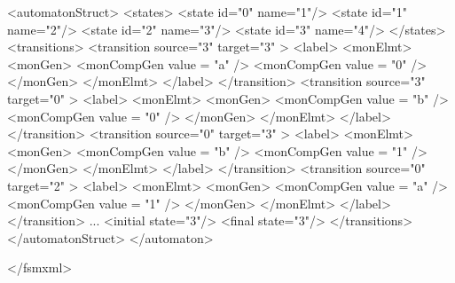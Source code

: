 {\footnotesize 
\begin{listingcont}
  <automatonStruct>
    <states>
    <state  id="0"  name="1"/>
    <state  id="1"  name="2"/>
    <state  id="2"  name="3"/>
    <state  id="3"  name="4"/>
    </states>
    <transitions>
      <transition  source="3"  target="3" >
        <label>
	  <monElmt>
	    <monGen>
	      <monCompGen value = "a" />
	      <monCompGen value = "0" />
	    </monGen>
	  </monElmt>
        </label>
      </transition>
      <transition  source="3"  target="0" >
        <label>
	  <monElmt>
	    <monGen>
	      <monCompGen value = "b" />
	      <monCompGen value = "0" />
	    </monGen>
	  </monElmt>
        </label>
      </transition>
      <transition  source="0"  target="3" >
        <label>
	  <monElmt>
	    <monGen>
	      <monCompGen value = "b" />
	      <monCompGen value = "1" />
	    </monGen>
	  </monElmt>
        </label>
      </transition>
      <transition  source="0"  target="2" >
        <label>
	  <monElmt>
	    <monGen>
	      <monCompGen value = "a" />
	      <monCompGen value = "1" />
	    </monGen>
	  </monElmt>
        </label>
      </transition>
      ...
      <initial state="3"/>
      <final   state="3"/>
    </transitions>
  </automatonStruct>
</automaton>

</fsmxml>
\end{listingcont}
}

\clearpage
